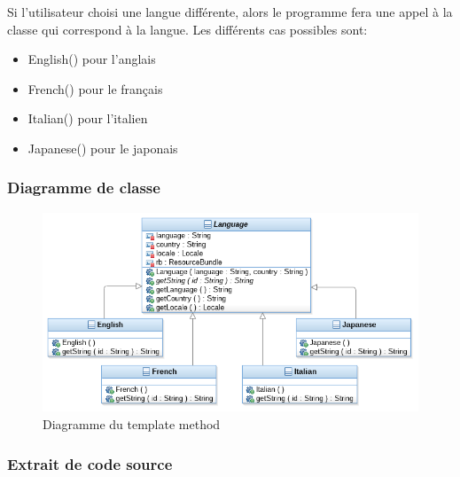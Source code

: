 Si l'utilisateur choisi une langue différente, alors le programme fera une appel à la classe qui correspond à la langue.
Les différents cas possibles sont:
\begin{itemize}
\item English() pour l'anglais
\item French() pour le français
\item Italian() pour l'italien
\item Japanese() pour le japonais
\end{itemize}

\subsubsection{Diagramme de classe}

\begin{figure}[h]
	\centering
	\includegraphics[width=\textwidth]{ttmc_template_method.png}
	\caption{Diagramme du template method}
	\label{fig:diag_template_method}
\end{figure}

\subsubsection{Extrait de code source}


